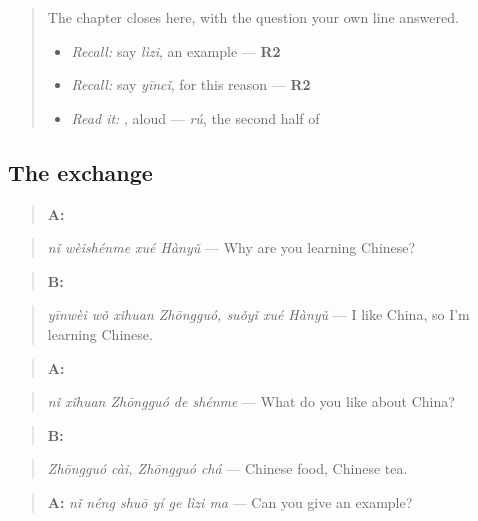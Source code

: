 \begin{quote}
The chapter closes here, with the question your own line answered.

\begin{itemize}
\raggedright
  \item \emph{Recall:} say \emph{lìzi}, an example — \textbf{R2}
  \item \emph{Recall:} say \emph{yīncǐ}, for this reason — \textbf{R2}
  \item \emph{Read it:} , aloud — \emph{rú}, the second half of 
\end{itemize}
\end{quote}

\subsection*{The exchange}
\begin{quote}
\textbf{A:} 
\end{quote}

\begin{quote}
\emph{nǐ wèishénme xué Hànyǔ} — Why are you learning Chinese?
\end{quote}

\begin{quote}
\textbf{B:}  
\end{quote}

\begin{quote}
\emph{yīnwèi wǒ xǐhuan Zhōngguó, suǒyǐ xué Hànyǔ} — I like China, so I'm learning Chinese.
\end{quote}

\begin{quote}
\textbf{A:} 
\end{quote}

\begin{quote}
\emph{nǐ xǐhuan Zhōngguó de shénme} — What do you like about China?
\end{quote}

\begin{quote}
\textbf{B:}  
\end{quote}

\begin{quote}
\emph{Zhōngguó cài, Zhōngguó chá} — Chinese food, Chinese tea.
\end{quote}

\begin{quote}
\textbf{A:} \emph{nǐ néng shuō yí ge lìzi ma} — Can you give an example?
\end{quote}

